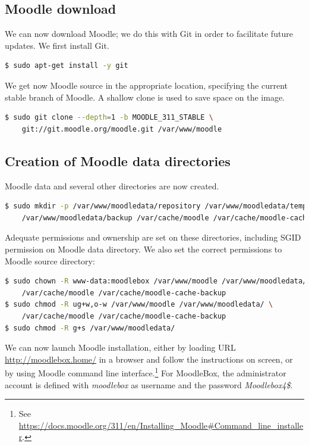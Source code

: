 \documentclass[12pt]{article}
\begin{document}
\subsection{Moodle download}

We can now download Moodle; we do this with Git in order to facilitate future updates.
We first install Git.
\begin{lstlisting}[language=bash]
$ sudo apt-get install -y git
\end{lstlisting}

We get now Moodle source in the appropriate location, specifying the current stable branch of Moodle.
A shallow clone is used to save space on the image.
\begin{lstlisting}[language=bash]
$ sudo git clone --depth=1 -b MOODLE_311_STABLE \
    git://git.moodle.org/moodle.git /var/www/moodle
\end{lstlisting}

\subsection{Creation of Moodle data directories}

Moodle data and several other directories are now created.
\begin{lstlisting}[language=bash]
$ sudo mkdir -p /var/www/moodledata/repository /var/www/moodledata/temp \
    /var/www/moodledata/backup /var/cache/moodle /var/cache/moodle-cache-backup
\end{lstlisting}
Adequate permissions and ownership are set on these directories, including SGID permission on Moodle data directory.
We also set the correct permissions to Moodle source directory:
\begin{lstlisting}[language=bash]
$ sudo chown -R www-data:moodlebox /var/www/moodle /var/www/moodledata/ \
    /var/cache/moodle /var/cache/moodle-cache-backup
$ sudo chmod -R ug+w,o-w /var/www/moodle /var/www/moodledata/ \
    /var/cache/moodle /var/cache/moodle-cache-backup
$ sudo chmod -R g+s /var/www/moodledata/
\end{lstlisting}

We can now launch Moodle installation, either by loading URL \url{http://moodlebox.home/} in a browser and follow the instructions on screen, or by using Moodle command line interface.\footnote{See \url{https://docs.moodle.org/311/en/Installing_Moodle\#Command_line_installer}.}
For MoodleBox, the administrator account is defined with \emph{moodlebox} as username and the password \emph{Moodlebox4\$}.
\end{document}
